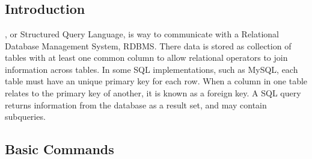 \chapter{\sql}
\label{sql}

\section{Introduction}
\label{sql:intro}

\sql, or Structured Query Language, is way to
communicate with a Relational Database Management System, RDBMS.
There data is stored as collection of tables with
at least one common column to allow relational operators
to join information across tables.
In some SQL implementations, such as MySQL, each table must have an unique primary key for each row.
When a column in one table relates to the primary key of another, it is known as a foreign key.
A SQL query returns information from the database as a result set, and may contain subqueries.

\section{Basic Commands}
\label{sql:basic}

